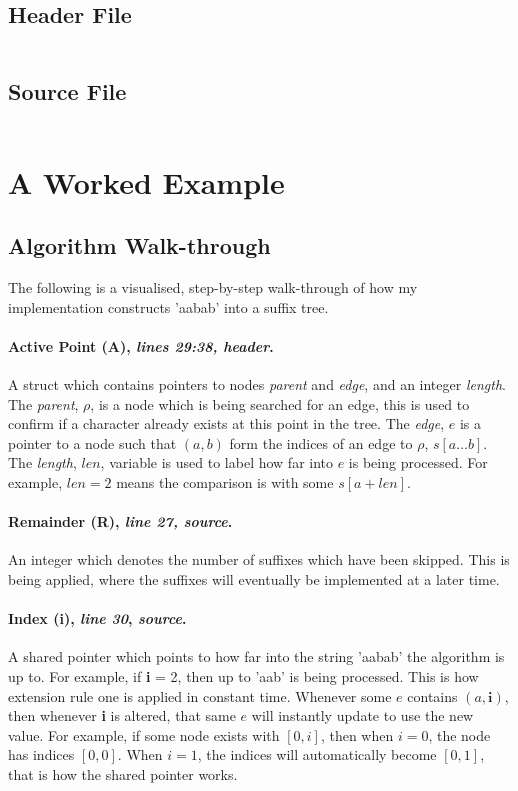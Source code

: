 \documentclass{article}
\begin{document}
	\subsection{Header File}
	\inputminted[linenos, frame=lines, fontsize=\scriptsize, tabsize=4, breaklines, label={src/headers/suffix\_tree.hpp}]{cpp}{../src/headers/suffix_tree.hpp}

	\subsection{Source File}
	\inputminted[linenos, frame=lines, fontsize=\scriptsize, tabsize=4, breaklines, label={src/suffix\_tree.cpp}]{cpp}{../src/suffix_tree.cpp}
	
	\clearpage
	\section{A Worked Example}
	
	\subsection{Algorithm Walk-through}
	The following is a visualised, step-by-step walk-through of how my implementation constructs 'aabab' into a suffix tree. 
	\paragraph{Active Point (A), \textit{lines 29:38, header}.}  A struct which contains pointers to nodes \textit{parent} and \textit{edge}, and an integer \textit{length}.  The \textit{parent}, $\rho$, is a node which is being searched for an edge, this is used to confirm if a character already exists at this point in the tree.  The \textit{edge}, $e$ is a pointer to a node such that $(a, b)$ form the indices of an edge to $\rho$, $s[a\dots b]$.  The \textit{length}, $len$, variable is used to label how far into $e$ is being processed.  For example, $ len = 2$ means the comparison is with some $s[a + len]$.
	
	\paragraph{Remainder (R), \textit{line 27, source}.}  An integer which denotes the number of suffixes which have been skipped.  This is being applied, where the suffixes will eventually be implemented at a later time.
	
	\paragraph{Index (i), \textit{line 30}, \textit{source}.} A shared pointer which points to how far into the string 'aabab' the algorithm is up to.  For example, if \textbf{i} = 2, then up to 'aab' is being processed.  This is how extension rule one is applied in constant time.  Whenever some $e$ contains $(a, \textbf{i})$, then whenever \textbf{i} is altered, that same $e$ will instantly update to use the new value.  For example, if some node exists with $[0, i]$, then when $i = 0$, the node has indices $[0, 0]$.  When $i =1$, the indices will automatically become $[0, 1]$, that is how the shared pointer works.
	
\end{document}
